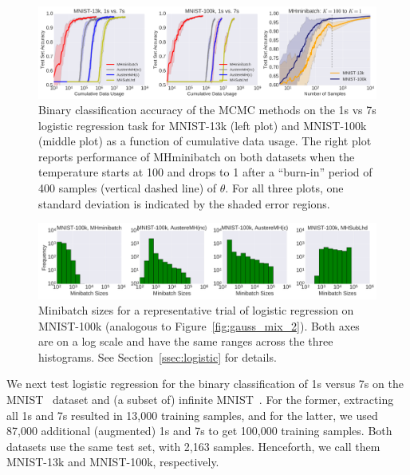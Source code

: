\documentclass[letterpaper]{article}
\begin{document}
\begin{figure}[t]
	\centering
	\includegraphics[width=1.0\linewidth]{logistic_regression_error_regions.png}
	\caption{
    Binary classification accuracy of the MCMC methods on the 1s vs 7s logistic
    regression task for MNIST-13k (left plot) and MNIST-100k (middle plot) as a
    function of cumulative data usage.  The right plot reports performance of
    {\sc MHminibatch} on both datasets when the temperature starts at 100 and
    drops to 1 after a ``burn-in'' period of 400 samples (vertical dashed line)
    of $\theta$.  For all three plots, one standard deviation is indicated by
    the shaded error regions.
    }
	\label{fig:logistic_performance}
\end{figure}

\begin{figure}[t]
	\centering
    \includegraphics[width=0.9\linewidth]{logistic_regression_histograms_mnist8m.png}
	\caption{
    Minibatch sizes for a representative trial of logistic regression on
    MNIST-100k (analogous to Figure~\ref{fig:gauss_mix_2}). Both axes are on a
    log scale and have the same ranges across the three histograms.  See
    Section~\ref{ssec:logistic} for details.
    }
	\label{fig:logistic_histograms_mnist8m}
\end{figure}

We next test logistic regression for the binary classification of 1s versus 7s
on the MNIST~\citep{lecun-mnisthandwrittendigit-2010} dataset and (a subset of)
infinite MNIST~\citep{loosli-canu-bottou-2006}. For the former, extracting all 1s
and 7s resulted in 13,000 training samples, and for the latter, we used 87,000
additional (augmented) 1s and 7s to get 100,000 training samples. Both datasets
use the same test set, with 2,163 samples. Henceforth, we call them MNIST-13k
and MNIST-100k, respectively.
\end{document}

